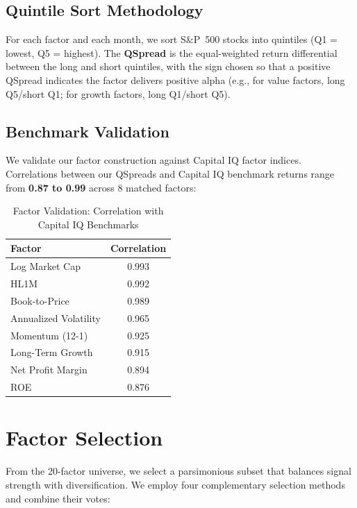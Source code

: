 \documentclass[12pt,a4paper]{article}
\begin{document}
\subsection{Quintile Sort Methodology}

For each factor and each month, we sort S\&P~500 stocks into quintiles (Q1 = lowest, Q5 = highest). The \textbf{QSpread} is the equal-weighted return differential between the long and short quintiles, with the sign chosen so that a positive QSpread indicates the factor delivers positive alpha (e.g., for value factors, long Q5/short Q1; for growth factors, long Q1/short Q5).

\subsection{Benchmark Validation}

We validate our factor construction against Capital IQ factor indices. Correlations between our QSpreads and Capital IQ benchmark returns range from \textbf{0.87 to 0.99} across 8 matched factors:

\begin{table}[H]
\centering
\caption{Factor Validation: Correlation with Capital IQ Benchmarks}
\label{tab:validation}
\begin{tabular}{lc}
\toprule
\textbf{Factor} & \textbf{Correlation} \\
\midrule
Log Market Cap & 0.993 \\
HL1M & 0.992 \\
Book-to-Price & 0.989 \\
Annualized Volatility & 0.965 \\
Momentum (12-1) & 0.925 \\
Long-Term Growth & 0.915 \\
Net Profit Margin & 0.894 \\
ROE & 0.876 \\
\bottomrule
\end{tabular}
\end{table}

\section{Factor Selection}
\label{sec:selection}

From the 20-factor universe, we select a parsimonious subset that balances signal strength with diversification. We employ four complementary selection methods and combine their votes:
\end{document}

